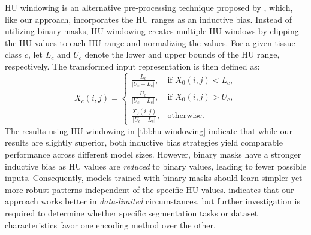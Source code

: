 \documentclass[conference]{IEEEtran}
\begin{document}
HU windowing is an alternative pre-processing technique proposed by \cite{kloenne_domain-specific_2020}, which, like our approach, incorporates the HU ranges as an inductive bias.
Instead of utilizing binary masks, HU windowing creates multiple HU windows by clipping the HU values to each HU range and normalizing the values.
For a given tissue class $c$, let $L_{c}$ and $U_{c}$ denote the lower and upper bounds of the HU range, respectively. The transformed input representation is then defined as:
%
\begin{equation}
X_{c}(i,j) = \begin{cases}
    \frac{L_c}{|U_c - L_c|}, & \text{if } X_{0}(i,j) < L_{c},\\
    \frac{U_c}{|U_c - L_c|}, & \text{if } X_{0}(i,j) > U_{c},\\
    \frac{X_{0}(i,j)}{|U_c - L_c|}, & \text{otherwise}.
\end{cases}
\label{eq:pixel_clipping}
\end{equation}
%
The results using HU windowing in \cref{tbl:hu-windowing} indicate that while our results are slightly superior, both inductive bias strategies yield comparable performance across different model sizes.
However, binary masks have a stronger inductive bias as HU values are \emph{reduced} to binary values, leading to fewer possible inputs.
Consequently, models trained with binary masks should learn simpler yet more robust patterns independent of the specific HU values.
 indicates that our approach works better in \emph{data-limited} circumstances, but further investigation is required to determine whether specific segmentation tasks or dataset characteristics favor one encoding method over the other.
\end{document}
